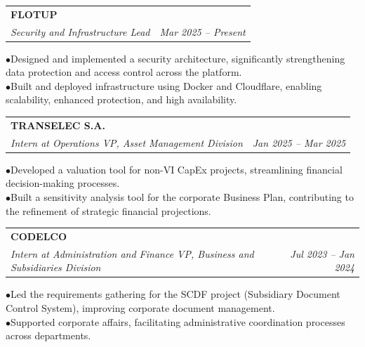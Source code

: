\documentclass[11pt, a4paper]{article}
\begin{document}
\noindent\begin{tabularx}{\linewidth}{@{}X r@{}}
  \textbf{FLOTUP} & \\
  \textit{Security and Infrastructure Lead} & \textit{Mar 2025 -- Present} \\
\end{tabularx}
\hspace{1em}$\bullet$\enspace Designed and implemented a security architecture, significantly strengthening data protection and access control across the platform. \\
\hspace{1em}$\bullet$\enspace Built and deployed infrastructure using Docker and Cloudflare, enabling scalability, enhanced protection, and high availability. \\
\vspace{4pt}

\noindent\begin{tabularx}{\linewidth}{@{}X r@{}}
  \textbf{TRANSELEC S.A.} & \\
  \textit{Intern at Operations VP, Asset Management Division} & \textit{Jan 2025 -- Mar 2025} \\
\end{tabularx}
\hspace{1em}$\bullet$\enspace Developed a valuation tool for non-VI CapEx projects, streamlining financial decision-making processes. \\
\hspace{1em}$\bullet$\enspace Built a sensitivity analysis tool for the corporate Business Plan, contributing to the refinement of strategic financial projections. \\
\vspace{4pt}

\noindent\begin{tabularx}{\linewidth}{@{}X r@{}}
  \textbf{CODELCO} & \\
  \textit{Intern at Administration and Finance VP, Business and Subsidiaries Division} & \textit{Jul 2023 -- Jan 2024} \\
\end{tabularx}
\hspace{1em}$\bullet$\enspace Led the requirements gathering for the SCDF project (Subsidiary Document Control System), improving corporate document management. \\
\hspace{1em}$\bullet$\enspace Supported corporate affairs, facilitating administrative coordination processes across departments. \\
\vspace{4pt}
\end{document}
